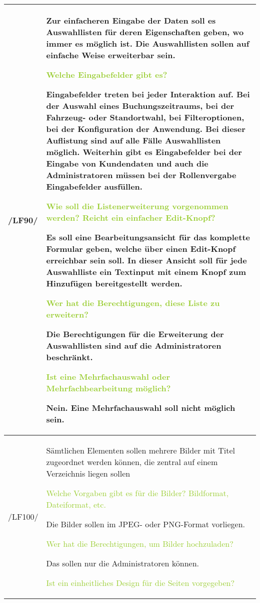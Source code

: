 \begin{tabular}[ht] {l | p{13cm}}
    \hline
    /LF90/ & Zur einfacheren Eingabe der Daten soll es Auswahllisten für deren Eigenschaften geben, wo immer es möglich ist. Die Auswahllisten sollen auf einfache Weise erweiterbar sein. 
    
    \textcolor{YellowGreen}{Welche Eingabefelder gibt es?}

    \textcolor{NavyBlue}{Eingabefelder treten bei jeder Interaktion auf. Bei der Auswahl eines Buchungszeitraums, bei der Fahrzeug- oder Standortwahl, bei Filteroptionen, bei der Konfiguration der Anwendung. Bei dieser Auflistung sind auf alle Fälle Auswahllisten möglich. Weiterhin gibt es Eingabefelder bei der Eingabe von Kundendaten und auch die Administratoren müssen bei der Rollenvergabe Eingabefelder ausfüllen.}
  
    \textcolor{YellowGreen}{Wie soll die Listenerweiterung vorgenommen werden? Reicht ein einfacher \grqq{}Edit\grqq{}-Knopf?}

    \textcolor{NavyBlue}{Es soll eine Bearbeitungsansicht für das komplette Formular geben, welche über einen \grqq{}Edit\grqq{}-Knopf erreichbar sein soll. In dieser Ansicht soll für jede Auswahlliste ein Textinput mit einem Knopf zum Hinzufügen bereitgestellt werden.}

    \textcolor{YellowGreen}{Wer hat die Berechtigungen, diese Liste zu erweitern?}

    \textcolor{NavyBlue}{Die Berechtigungen für die Erweiterung der Auswahllisten sind auf die Administratoren beschränkt.}

    \textcolor{YellowGreen}{Ist eine Mehrfachauswahl oder Mehrfachbearbeitung möglich?}

    \textcolor{NavyBlue}{Nein. Eine Mehrfachauswahl soll nicht möglich sein.}
    \\
    \hline
    /LF100/ & Sämtlichen Elementen sollen mehrere Bilder mit Titel zugeordnet werden können, die zentral auf einem Verzeichnis liegen sollen 
    
    \textcolor{YellowGreen}{Welche Vorgaben gibt es für die Bilder? Bildformat, Dateiformat, etc.}

    \textcolor{NavyBlue}{Die Bilder sollen im JPEG- oder PNG-Format vorliegen.}

    \textcolor{YellowGreen}{Wer hat die Berechtigungen, um Bilder hochzuladen?}

    \textcolor{NavyBlue}{Das sollen nur die Administratoren können.}

    \textcolor{YellowGreen}{Ist ein einheitliches Design für die Seiten vorgegeben?}


\end{tabular}
